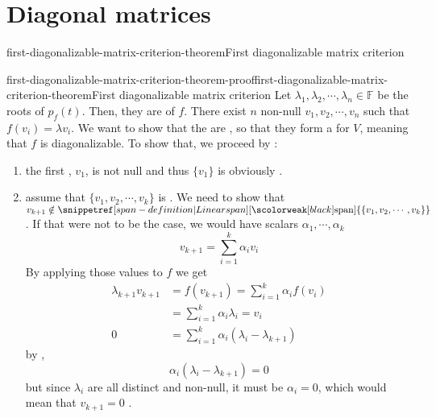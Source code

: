 \documentclass[preview]{standalone}
\begin{document}
\genpage

\section{Diagonal matrices}

\begin{snippettheorem}{first-diagonalizable-matrix-criterion-theorem}{First diagonalizable matrix criterion}
    \todo
\end{snippettheorem}

\begin{snippetproof}{first-diagonalizable-matrix-criterion-theorem-proof}{first-diagonalizable-matrix-criterion-theorem}{First diagonalizable matrix criterion}
    Let \(\lambda_1, \lambda_2, \cdots, \lambda_n \in \mathbb{F}\) be the
    roots of \(p_f(t)\). Then, they are \eigenvalue[eigenvalues] of \(f\).
    There exist \(n\) non-null \vector[vectors] \(v_1, v_2, \cdots, v_n\)
    such that \(f(v_i) = \lambda v_i\). We want to show that the \eigenvector[eigenvectors]
    are \linearlyindependent, so that they form a \basis for \(V\), meaning
    that \(f\) is diagonalizable. %
    To show that, we proceed by \principleofinduction[induction]:
    \begin{enumerate}
        \item the first \vector,
        \(v_1\), is not null and thus \(\{v_1\}\) is obviously \linearlyindependent.
        \item assume that \(\{v_1, v_2, \cdots, v_k\}\) is \linearlyindependent. We need to show that
        \(v_{k+1} \notin \linearspan\{\{v_1, v_2, \cdots, v_k\}\}\).
        If that were not to be the case, we would have scalars \(\alpha_1, \cdots, \alpha_k\)
        \[
            v_{k+1} = \sum_{i=1}^k \alpha_i v_i
        \]
        By applying those values to \(f\) we get
        \begin{align*}
            \lambda_{k+1} v_{k+1} &= f(v_{k+1}) = \sum_{i=1}^k \alpha_i f(v_i) \\
            &= \sum_{i=1}^k \alpha_i \lambda_i = v_i \\
            0 &= \sum_{i=1}^k \alpha_i(\lambda_i - \lambda_{k+1})
        \end{align*}
        by ,
        \[
            \alpha_i(\lambda_i - \lambda_{k+1}) = 0
        \]
        but since \(\lambda_i\) are all distinct and non-null, it must be
        \(\alpha_i = 0\), which would mean that \(v_{k+1} = 0\) \lightning.
    \end{enumerate}
\end{snippetproof}
\end{document}
